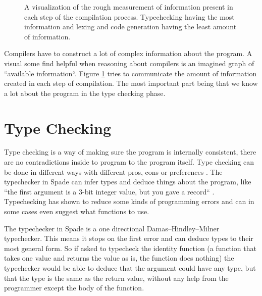 \documentclass[msc,lith,english]{liuthesis}
\begin{document}
\begin{figure}
\begin{center}
  \caption{A visualization of the rough measurement of information present in each step of the compilation process. Typechecking having the most information and lexing and code generation having the least amount of information.}
  \label{fig:InformationCompilation}
\end{center}
\end{figure}

Compilers have to construct a lot of complex information about the program. A visual some find helpful when reasoning about compilers is an imagined graph of ``available information``. Figure \ref{fig:InformationCompilation} tries to communicate the amount of information created in each step of compilation. The most important part being that we know a lot about the program in the type checking phase.

\section{Type Checking} %
\label{sec:TypeChecking}
Type checking is a way of making sure the program is internally consistent, there are no contradictions inside to program to the program itself. Type checking can be done in different ways with different pros, cons or preferences \cite{src:TypeCheckersBook}. The typechecker in Spade can infer types and deduce things about the program, like ``the first argument is a 3-bit integer value, but you gave a record`` \cite{src:spadeAnHDL}. Typechecking has shown to reduce some kinds of programming errors and can in some cases even suggest what functions to use.

The typechecker in Spade is a one directional Damas–Hindley–Milner typechecker. This means it stops on the first error and can deduce types to their most general form. So if asked to typecheck the identity function (a function that takes one value and returns the value as is, the function does nothing) the typechecker would be able to deduce that the argument could have any type, but that the type is the same as the return value, without any help from the programmer except the body of the function. \cite{src:DamasHindleyMilner}
\end{document}
